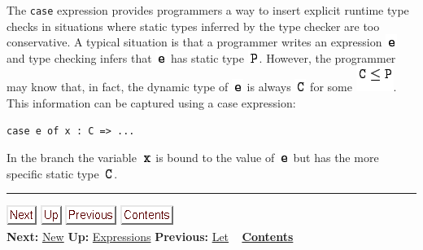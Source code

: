 \documentclass[]{article}
\begin{document}
The \texttt{case} expression provides programmers a way to insert
explicit runtime type checks in situations where static types inferred
by the type checker are too conservative. A typical situation is that a
programmer writes an expression \includegraphics{img27.png} and type
checking infers that \includegraphics{img27.png} has static type
\includegraphics{img3.png}. However, the programmer may know that, in
fact, the dynamic type of \includegraphics{img27.png} is always
\includegraphics{img28.png} for some \includegraphics{img1.png}. This
information can be captured using a case expression:

\begin{verbatim}
case e of x : C => ...
\end{verbatim}

In the branch the variable \includegraphics{img29.png} is bound to the
value of \includegraphics{img27.png} but has the more specific static
type \includegraphics{img28.png}.

\begin{center}\rule{3in}{0.4pt}\end{center}

\href{node23.html}{\includegraphics{next.png}}
\href{node13.html}{\includegraphics{up.png}}
\href{node21.html}{\includegraphics{prev.png}}
\href{node1.html}{\includegraphics{contents.png}} \\ \textbf{Next:}
\href{node23.html}{New} \textbf{Up:} \href{node13.html}{Expressions}
\textbf{Previous:} \href{node21.html}{Let} ~
\textbf{\href{node1.html}{Contents}}
\end{document}
